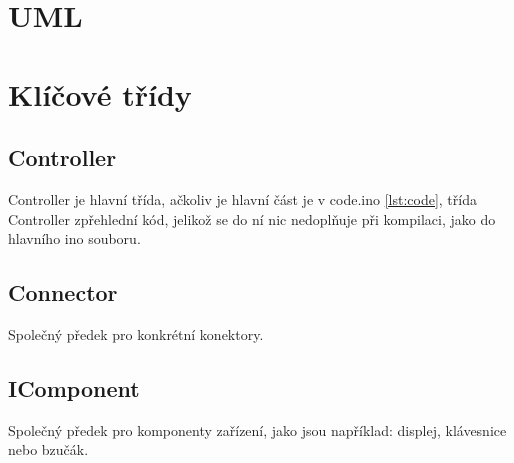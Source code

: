 
\section{UML}

\section{Klíčové třídy}
\subsection{Controller}
Controller je hlavní třída, ačkoliv je hlavní část je v code.ino \ref{lst:code}, třída Controller zpřehlední kód, jelikož se do ní nic nedoplňuje při kompilaci, jako do hlavního ino souboru.

\subsection{Connector}
Společný předek pro konkrétní konektory.

\subsection{IComponent}
Společný předek pro komponenty zařízení, jako jsou například: displej, klávesnice nebo bzučák.
